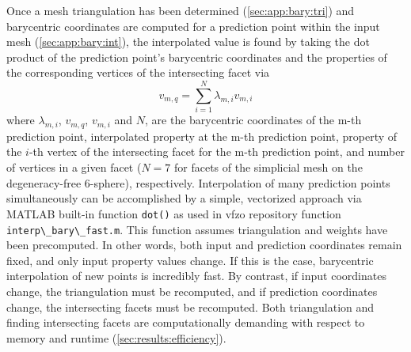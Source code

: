 \documentclass[final,twocolumn,12pt]{elsarticle}
\newcommand{\matlab}[1]{\mbox{\lstinline[style=Matlab-editor]{#1}}}
\newcommand{\inpt}{input}
\newcommand{\outpt}{prediction}
\newcommand{\vfzorepo}{\gls{vfzo} repository}
\begin{document}
\begin{appendices}
Once a mesh triangulation has been determined (\cref{sec:app:bary:tri}) and barycentric coordinates are computed for a \outpt{} point within the \inpt{} mesh (\cref{sec:app:bary:int}), the interpolated value is found by taking the dot product of the \outpt{} point's barycentric coordinates and the properties of the corresponding vertices of the intersecting facet via
\begin{equation}
\label{eq:bary-interp}
v_{m,q}=\underset{i=1}{\overset{N}{\sum }}\lambda _{m,i} v_{m,i}
\end{equation}
where $\lambda_{m,i}$, $v_{m,q}$, $v_{m,i}$ and $N$, are the barycentric coordinates of the m-th \outpt{} point, interpolated property at the m-th \outpt{} point, property of the $i$-th vertex of the intersecting facet for the m-th \outpt{} point, and number of vertices in a given facet ($N = 7$ for facets of the simplicial mesh on the degeneracy-free 6-sphere), respectively. Interpolation of many \outpt{} points simultaneously can be accomplished by a simple, vectorized approach via MATLAB built-in function \matlab{dot()} as used in \vfzorepo{} function \matlab{interp\_bary\_fast.m}. This function assumes triangulation and weights have been precomputed. In other words, both \inpt{} and \outpt{} coordinates remain fixed, and only \inpt{} property values change. If this is the case, barycentric interpolation of new points is incredibly fast. By contrast, if \inpt{} coordinates change, the triangulation must be recomputed, and if \outpt{} coordinates change, the intersecting facets must be recomputed. Both triangulation and finding intersecting facets are computationally demanding with respect to memory and runtime (\cref{sec:results:efficiency}).

\end{appendices}

\printglossaries




% 
\end{document}
